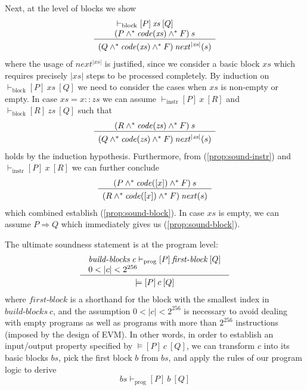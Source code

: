 \documentclass[sigplan,10pt,review]{acmart}\settopmatter{printfolios=true,printccs=false,printacmref=false}
\newcommand{\subpred}{\Rightarrow}
\newcommand{\sconj}{\wedge^*}
\newcommand{\tvalid}[3]{\models[#1]\:#2\:[#3]}
\newcommand{\ttrip}[5]{\mathit{#1} \vdash_{\mathrm{#2}}[#3]\:#4\:[#5]}
\newcommand{\xnext}{\mathit{next}}
\newcommand{\code}[1]{\mathit{code}(#1)}
\newcommand{\RuleC}[2]{\begin{array}{c}#1\\\hline\noalign{\smallskip}#2\end{array}}
\newcommand{\bblocks}{\mathit{build\mbox{-}blocks}}
\newcommand{\fblock}{\mathit{first\mbox{-}block}}
\newcommand{\len}[1]{|#1|}
\begin{document}
Next, at the level of blocks we show
\begin{equation}
\label{prop:sound-block}
\RuleC{\begin{array}{l}
         \ttrip{}{block}{P}{\mathit{xs}}{Q} \\
         (P \sconj \code{\mathit{xs}} \sconj F)\: s
       \end{array}}
 {(Q \sconj \code{\mathit{xs}} \sconj F)\: \xnext^{\len{\mathit{xs}}}(s)}
\end{equation}
where the usage of $\xnext^{\len{\mathit{xs}}}$ is justified, since we consider
a basic block $\mathit{xs}$ which requires precisely $\len{\mathit{xs}}$ steps
to be processed completely.   
%
By induction on $\ttrip{}{block}{P}{\mathit{xs}}{Q}$ we need to consider the cases
when $\mathit{xs}$ is non-empty or empty.
In case $\mathit{xs} = x::\mathit{zs}$ we can assume $\ttrip{}{instr}{P}{x}{R}$
and $\ttrip{}{block}{R}{\mathit{zs}}{Q}$ such that 
\[
\RuleC{(R \sconj \code{\mathit{zs}} \sconj F)\: s}
 {(Q \sconj \code{\mathit{zs}} \sconj F)\: \xnext^{\len{\mathit{zs}}}(s)}
\]
holds by the induction hypothesis. 
Furthermore, from (\ref{prop:sound-instr}) and $\ttrip{}{instr}{P}{x}{R}$ we can further conclude 
\[
\RuleC{(P \sconj \code{[x]} \sconj F)\: s}
      {(R \sconj \code{[x]} \sconj F)\: \xnext(s)}
\]
which combined establish (\ref{prop:sound-block}).
In case $\mathit{xs}$ is empty, we can assume $P \subpred Q$ which
immediately gives us (\ref{prop:sound-block}). 

The ultimate soundness statement is at the program level:
\begin{equation}
\label{prop:sound1}
\RuleC{\begin{array}{l}
       \ttrip{\bblocks\: c}{prog}{P}{\fblock}{Q} \\
       0 < \len{c} < 2^{256} 
       \end{array}}
{\tvalid{P}{c}{Q}}
\end{equation}
where $\fblock$ is a shorthand for the block with the smallest index in $\bblocks\: c$, and
the assumption $0 < \len{c} < 2^{256}$ is necessary to avoid dealing with empty programs
as well as programs with more than $2^{256}$ instructions (imposed by 
the design of EVM). In other words, in order to establish an input/output property specified by 
$\tvalid{P}{c}{Q}$, we can transform $c$ into its basic blocks $\mathit{bs}$, 
pick the first block $b$ from $\mathit{bs}$, and
apply the rules of our program logic to derive 
\[
\ttrip{\mathit{bs}}{prog}{P}{b}{Q}
\]
\end{document}
